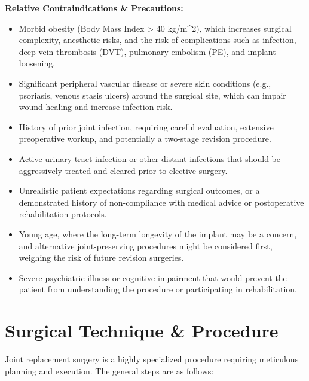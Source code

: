 \textbf{Relative Contraindications \& Precautions:}
\begin{itemize}
  \item Morbid obesity (Body Mass Index > 40 kg/m\textasciicircum{}2), which increases surgical complexity, anesthetic risks, and the risk of complications such as infection, deep vein thrombosis (DVT), pulmonary embolism (PE), and implant loosening.
  \item Significant peripheral vascular disease or severe skin conditions (e.g., psoriasis, venous stasis ulcers) around the surgical site, which can impair wound healing and increase infection risk.
  \item History of prior joint infection, requiring careful evaluation, extensive preoperative workup, and potentially a two-stage revision procedure.
  \item Active urinary tract infection or other distant infections that should be aggressively treated and cleared prior to elective surgery.
  \item Unrealistic patient expectations regarding surgical outcomes, or a demonstrated history of non-compliance with medical advice or postoperative rehabilitation protocols.
  \item Young age, where the long-term longevity of the implant may be a concern, and alternative joint-preserving procedures might be considered first, weighing the risk of future revision surgeries.
  \item Severe psychiatric illness or cognitive impairment that would prevent the patient from understanding the procedure or participating in rehabilitation.
\end{itemize}

\section*{Surgical Technique \& Procedure}
Joint replacement surgery is a highly specialized procedure requiring meticulous planning and execution. The general steps are as follows:

